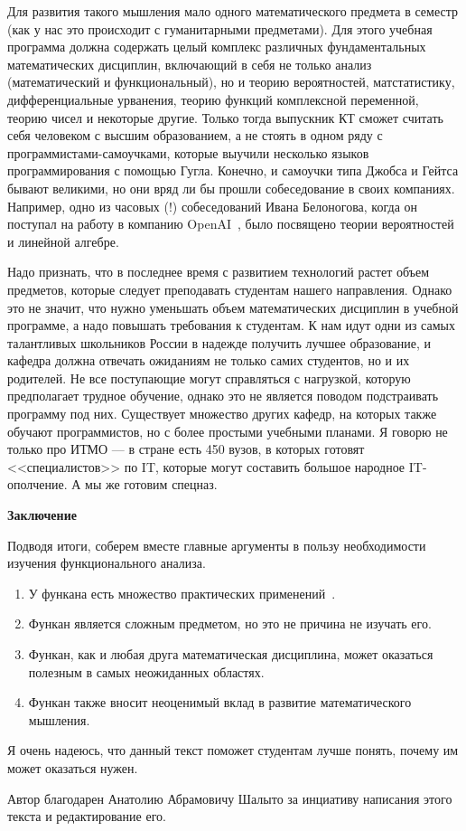 \documentclass[russian]{article}
\begin{document}
Для развития такого мышления мало одного математического предмета в семестр (как у нас это происходит с гуманитарными предметами). Для этого учебная программа должна содержать целый комплекс различных фундаментальных математических дисциплин, включающий в себя не только анализ (математический и функциональный), но и теорию вероятностей, матстатистику, дифференциальные урванения, теорию функций комплексной переменной, теорию чисел и некоторые другие. Только тогда выпускник КТ сможет считать себя человеком с высшим образованием, а не стоять в одном ряду с программистами-самоучками, которые выучили несколько языков программирования с помощью Гугла. Конечно, и самоучки типа Джобса и Гейтса бывают великими, но они вряд ли бы прошли собеседование в своих компаниях. Например, одно из часовых (!) собеседований Ивана Белоногова, когда он поступал на работу в компанию OpenAI~\cite{}, было посвящено теории вероятностей и линейной алгебре.

Надо признать, что в последнее время с развитием технологий растет объем предметов, которые следует преподавать студентам нашего направления. Однако это не значит, что нужно уменьшать объем математических дисциплин в учебной программе, а надо повышать требования к студентам. К нам идут одни из самых талантливых школьников России в надежде получить лучшее образование, и кафедра должна отвечать ожиданиям не только самих студентов, но и их родителей. Не все поступающие могут справляться с нагрузкой, которую предполагает трудное обучение, однако это не является поводом подстраивать программу под них. Существует множество других кафедр, на которых также обучают программистов, но с более простыми учебными планами. Я говорю не только про ИТМО --- в стране есть 450 вузов, в которых готовят <<специалистов>> по IT, которые могут составить большое народное IT-ополчение. А мы же готовим спецназ.

\textbf{Заключение}

Подводя итоги, соберем вместе главные аргументы в пользу необходимости изучения функционального анализа.

\begin{enumerate}
  \item У функана есть множество практических применений~\cite{quantum,kollats,prob}.
  \item Функан является сложным предметом, но это не причина не изучать его.
  \item Функан, как и любая друга математическая дисциплина, может оказаться полезным в самых неожиданных областях.
  \item Функан также вносит неоценимый вклад в развитие математического мышления.
\end{enumerate}

Я очень надеюсь, что данный текст поможет студентам лучше понять, почему им может оказаться нужен.

Автор благодарен Анатолию Абрамовичу Шалыто за инциативу написания этого текста и редактирование его.



\end{document}
